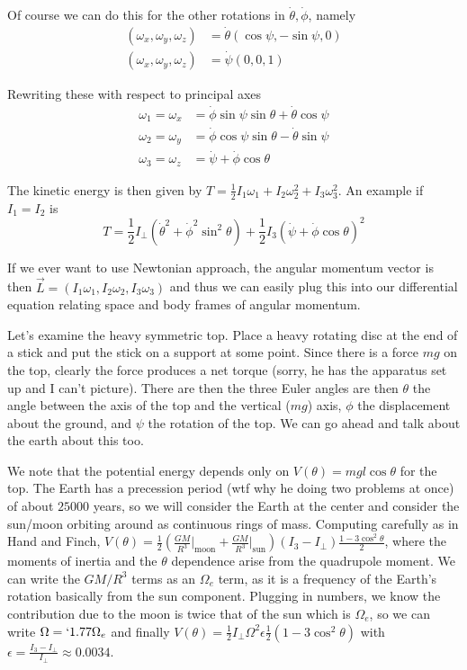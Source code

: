 \documentclass[10pt]{report}
\begin{document}
Of course we can do this for the other rotations in $\dot{\theta}, \dot{\phi}$, namely
\begin{align*}
    \left( \omega_x, \omega_y, \omega_z \right) &= \dot{\theta}\left( \cos \psi, -\sin \psi, 0 \right)\\
    \left( \omega_x, \omega_y, \omega_z \right) &= \dot{\psi}(0,0,1)
\end{align*}

Rewriting these with respect to principal axes
\begin{align*}
    \omega_1 = \omega_x &= \dot{\phi}\sin \psi \sin \theta + \dot{\theta}\cos \psi\\
    \omega_2 = \omega_y &= \dot{\phi}\cos \psi\sin \theta - \dot{\theta}\sin \psi\\
    \omega_3 = \omega_z &= \dot{\psi} + \dot{\phi}\cos \theta
\end{align*}

The kinetic energy is then given by $T = \frac{1}{2}I_1\omega_1 + I_2 \omega_2^2 + I_3 \omega_3^2$. An example if $I_1 = I_2$ is
$$T = \frac{1}{2}I_{\perp} \left( \dot{\theta}^2 + \dot{\phi}^2\sin^2\theta \right) + \frac{1}{2}I_3\left( \dot{\psi} + \dot{\phi}\cos \theta \right)^2$$

If we ever want to use Newtonian approach, the angular momentum vector is then $\vec{L} = \left( I_1 \omega_1, I_2 \omega_2, I_3 \omega_3 \right)$ and thus we can easily plug this into our differential equation relating space and body frames of angular momentum.

Let's examine the heavy symmetric top. Place a heavy rotating disc at the end of a stick and put the stick on a support at some point. Since there is a force $mg$ on the top, clearly the force produces a net torque (sorry, he has the apparatus set up and I can't picture). There are then the three Euler angles are then $\theta$ the angle between the axis of the top and the vertical ($mg$) axis, $\phi$ the displacement about the ground, and $\psi$ the rotation of the top. We can go ahead and talk about the earth about this too.

We note that the potential energy depends only on $V(\theta) = mgl\cos \theta$ for the top. The Earth has a precession period (wtf why he doing two problems at once) of about $25000$ years, so we will consider the Earth at the center and consider the sun/moon orbiting around as continuous rings of mass. Computing carefully as in Hand and Finch, $V(\theta) = \frac{1}{2}\left( \frac{GM}{R^3}\Big|_{\text{moon}} + \frac{GM}{R^3}\Big|_{\text{sun}} \right)(I_3 - I_\perp)\frac{1-3\cos^2\theta}{2}$, where the moments of inertia and the $\theta$ dependence arise from the quadrupole moment. We can write the $GM/R^3$ terms as an $\Omega_e$ term, as it is a frequency of the Earth's rotation basically from the sun component. Plugging in numbers, we know the contribution due to the moon is twice that of the sun which is $\Omega_e$, so we can write $\Omega = `1.77 \Omega_e$ and finally $V(\theta) = \frac{1}{2}I_\perp \Omega^2 \epsilon \frac{1}{2}\left( 1-3\cos^2\theta \right)$ with $\epsilon = \frac{I_3 - I_\perp}{I_\perp} \approx 0.0034$.
\end{document}
